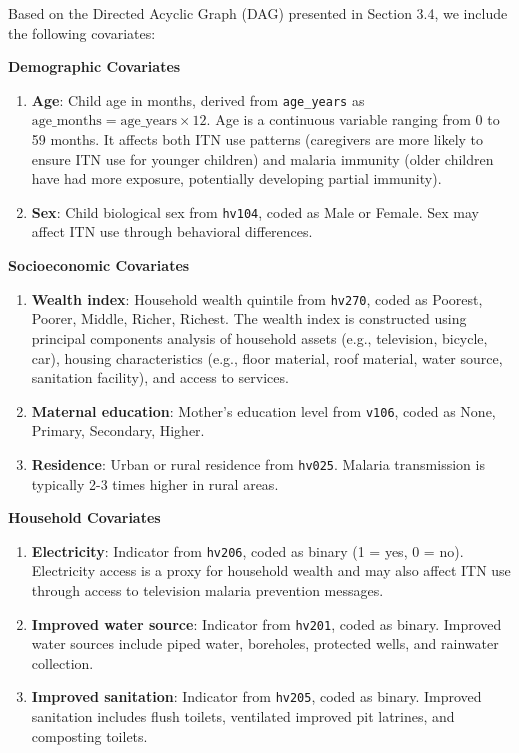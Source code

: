 Based on the Directed Acyclic Graph (DAG) presented in Section 3.4, we include the following covariates:

\textbf{Demographic Covariates}

\begin{enumerate}
	\item \textbf{Age}: Child age in months, derived from \texttt{age\_years} as $\text{age\_months} = \text{age\_years} \times 12$. Age is a continuous variable ranging from 0 to 59 months. It affects both ITN use patterns (caregivers are more likely to ensure ITN use for younger children) and malaria immunity (older children have had more exposure, potentially developing partial immunity).
	
	\item \textbf{Sex}: Child biological sex from \texttt{hv104}, coded as Male or Female. Sex may affect ITN use through behavioral differences.
\end{enumerate}

\textbf{Socioeconomic Covariates}

\begin{enumerate}
	\item \textbf{Wealth index}: Household wealth quintile from \texttt{hv270}, coded as Poorest, Poorer, Middle, Richer, Richest. The wealth index is constructed using principal components analysis of household assets (e.g., television, bicycle, car), housing characteristics (e.g., floor material, roof material, water source, sanitation facility), and access to services.
	
	\item \textbf{Maternal education}: Mother's education level from \texttt{v106}, coded as None, Primary, Secondary, Higher.
	
	\item \textbf{Residence}: Urban or rural residence from \texttt{hv025}. Malaria transmission is typically 2-3 times higher in rural areas.
\end{enumerate}

\textbf{Household Covariates}

\begin{enumerate}
	\item \textbf{Electricity}: Indicator from \texttt{hv206}, coded as binary (1 = yes, 0 = no). Electricity access is a proxy for household wealth and may also affect ITN use through access to television malaria prevention messages.
	
	\item \textbf{Improved water source}: Indicator from \texttt{hv201}, coded as binary. Improved water sources include piped water, boreholes, protected wells, and rainwater collection.
	
	\item \textbf{Improved sanitation}: Indicator from \texttt{hv205}, coded as binary. Improved sanitation includes flush toilets, ventilated improved pit latrines, and composting toilets.
\end{enumerate}

